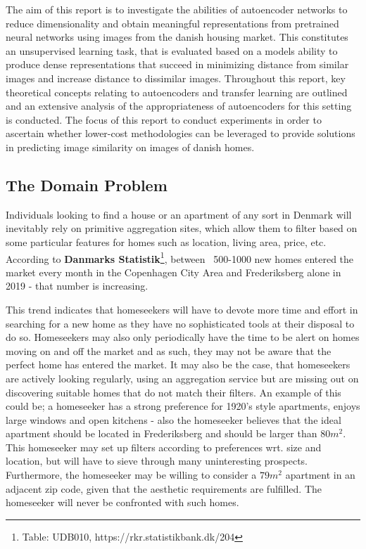 The aim of this report is to investigate the abilities of autoencoder networks to reduce dimensionality and obtain meaningful representations from pretrained neural networks using images from the danish housing market.
This constitutes an unsupervised learning task, that is evaluated based on a models ability to produce dense representations that succeed in minimizing distance from similar images and increase distance to dissimilar images.
Throughout this report, key theoretical concepts relating to autoencoders and transfer learning are outlined and an extensive analysis of the appropriateness of autoencoders for this setting is conducted.
The focus of this report to conduct experiments in order to ascertain whether lower-cost methodologies can be leveraged to provide solutions in predicting image similarity on images of danish homes.

\subsection{The Domain Problem}
Individuals looking to find a house or an apartment of any sort in Denmark will inevitably rely on primitive aggregation sites, which allow them to filter based on some particular features for homes such as location, living area, price, etc.
According to \textbf{Danmarks Statistik}\footnote{Table: UDB010, https://rkr.statistikbank.dk/204}, between ~500-1000 new homes entered the market every month in the Copenhagen City Area and Frederiksberg alone in 2019 - that number is increasing.

This trend indicates that homeseekers will have to devote more time and effort in searching for a new home as they have no sophisticated tools at their disposal to do so. 
Homeseekers may also only periodically have the time to be alert on homes moving on and off the market and as such, they may not be aware that the perfect home has entered the market. 
\newline
It may also be the case, that homeseekers are actively looking regularly, using an aggregation service but are missing out on discovering suitable homes that do not match their filters. 
An example of this could be; a homeseeker has a strong preference for 1920's style apartments, enjoys large windows and open kitchens - also the homeseeker believes that the ideal apartment should be located in Frederiksberg and should be larger than $80m^{2}$.
This homeseeker may set up filters according to preferences wrt. size and location, but will have to sieve through many uninteresting prospects.
Furthermore, the homeseeker may be willing to consider a $79m^{2}$ apartment in an adjacent zip code, given that the aesthetic requirements are fulfilled.
The homeseeker will never be confronted with such homes.

